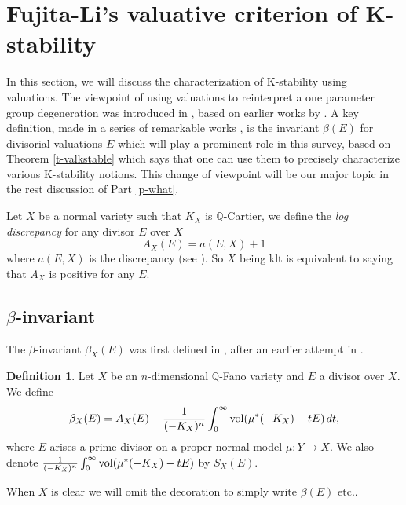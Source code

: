 \documentclass[12pt,reqno]{amsart}%
\theoremstyle{definition}
\newtheorem{defn}[thm]{Definition}
\theoremstyle{remark}
\newcommand{\vol}{{\rm vol}}
\begin{document}
\section{Fujita-Li's valuative criterion of K-stability}\label{s-twoinvariants}


In this section, we will discuss the characterization of K-stability using valuations. The viewpoint of using valuations to reinterpret a one parameter group degeneration was introduced in \cite{BHJ17}, based on earlier works by \cite{Nys12, Sze15}. A key definition, made in a series of remarkable works \cite{Fuj18, Fuj19b, Li17}, is the invariant $\beta(E)$ for divisorial valuations $E$ which will play a prominent role in this survey, based on Theorem \ref{t-valkstable} which says that one can use them to precisely characterize various K-stability notions. This change of viewpoint will be our major topic in the rest discussion of  Part \ref{p-what}.
 






Let $X$ be a normal variety such that $K_X$ is $\mathbb{Q}$-Cartier, we define the {\it log discrepancy} for any divisor $E$ over $X$
$$A_{X}(E)=a(E,X)+1$$ where $a(E,X)$ is the discrepancy (see \cite[Definition 2.25]{KM98}). So $X$ being klt is equivalent to saying that $A_X$ is positive for any $E$. 






\subsection{$\beta$-invariant}\label{ss-invariant}
The $\beta$-invariant $\beta_{X}(E)$  was first defined in \cite{Fuj19b, Li17}, after an earlier attempt in \cite{Fuj18}.
\begin{defn}\label{d-betadivisor}
Let $X$ be an $n$-dimensional   $\mathbb{Q}$-Fano variety and $E$ a divisor over $X$. 
 We define
\begin{equation}\label{e-beta}
\beta_{X}(E)= A_{X}(E) -\frac{1}{(-K_X)^n} \int_0^\infty  \vol(\mu^*(-K_X)- t E)\, dt,
\end{equation}
where $E$ arises a prime divisor on a proper normal model $\mu:Y \to X$. We also denote $\frac{1}{(-K_X)^n} \int_0^\infty  \vol(\mu^*(-K_X)- t E)$ by $S_X(E)$.
\end{defn}

When $X$ is clear we will omit the decoration to simply write $\beta(E)$ etc..
\end{document}
